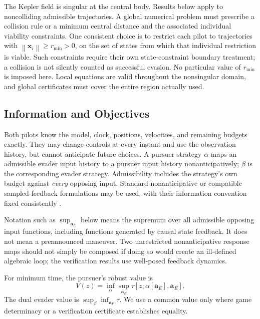 \documentclass[journal,a4paper]{IEEEtran}
\newcommand{\norm}[1]{\left\|#1\right\|}
\begin{document}
The Kepler field is singular at the central body. Results below apply to noncolliding admissible trajectories. A global numerical problem must prescribe a collision rule or a minimum central distance and the associated individual viability constraints. One consistent choice is to restrict each pilot to trajectories with $\norm{\mathbf x_i}\ge r_{\min}>0$, on the set of states from which that individual restriction is viable. Such constraints require their own state-constraint boundary treatment; a collision is not silently counted as successful evasion. No particular value of $r_{\min}$ is imposed here. Local equations are valid throughout the nonsingular domain, and global certificates must cover the entire region actually used.

\subsection{Information and Objectives}
Both pilots know the model, clock, positions, velocities, and remaining budgets exactly. They may change controls at every instant and use the observation history, but cannot anticipate future choices. A pursuer strategy $\alpha$ maps an admissible evader input history to a pursuer input history nonanticipatively; $\beta$ is the corresponding evader strategy. Admissibility includes the strategy's own budget against \emph{every} opposing input. Standard nonanticipative or compatible sampled-feedback formulations may be used, with their information convention fixed consistently \cite{EvansSouganidis1984}.

Notation such as $\sup_{\mathbf a_E}$ below means the supremum over all admissible opposing input functions, including functions generated by causal state feedback. It does not mean a preannounced maneuver. Two unrestricted nonanticipative response maps should not simply be composed if doing so would create an ill-defined algebraic loop; the verification results use well-posed feedback dynamics.

For minimum time, the pursuer's robust value is
\begin{equation}
 V(z)=\inf_\alpha\sup_{\mathbf a_E}
             \tau[z;\alpha[\mathbf a_E],\mathbf a_E].
 \label{eq:timevalue}
\end{equation}
The dual evader value is $\sup_\beta\inf_{\mathbf a_P}\tau$. We use a common value only where game determinacy or a verification certificate establishes equality.
\end{document}

